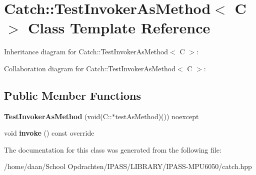 \hypertarget{classCatch_1_1TestInvokerAsMethod}{}\section{Catch\+:\+:Test\+Invoker\+As\+Method$<$ C $>$ Class Template Reference}
\label{classCatch_1_1TestInvokerAsMethod}


Inheritance diagram for Catch\+:\+:Test\+Invoker\+As\+Method$<$ C $>$\+:


Collaboration diagram for Catch\+:\+:Test\+Invoker\+As\+Method$<$ C $>$\+:
\subsection*{Public Member Functions}
\begin{DoxyCompactItemize}
\item 
\mbox{\label{classCatch_1_1TestInvokerAsMethod_a119c4bdbbdd95c42859c18541987a1a4}} 
{\bfseries Test\+Invoker\+As\+Method} (void(C\+::$\ast$test\+As\+Method)()) noexcept
\item 
\mbox{\label{classCatch_1_1TestInvokerAsMethod_a8115a06efe273f4112ec0b5452c1b5f2}} 
void {\bfseries invoke} () const override
\end{DoxyCompactItemize}


The documentation for this class was generated from the following file\+:\begin{DoxyCompactItemize}
\item 
/home/daan/\+School Opdrachten/\+I\+P\+A\+S\+S/\+L\+I\+B\+R\+A\+R\+Y/\+I\+P\+A\+S\+S-\/\+M\+P\+U6050/catch.\+hpp\end{DoxyCompactItemize}
